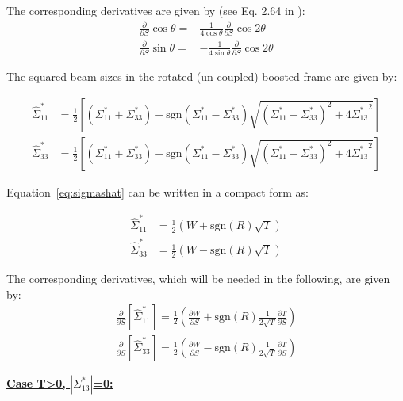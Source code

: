 The corresponding derivatives are given by (see Eq. 2.64 in \cite{refpaper}):
\begin{align}
\frac{\partial }{\partial S} \cos \theta =& \frac{1}{4 \cos \theta} \frac{\partial }{\partial S} \cos 2\theta \\
\frac{\partial }{\partial S} \sin \theta =& -\frac{1}{4 \sin \theta} \frac{\partial }{\partial S} \cos 2\theta \label{eq:dS_sintheta}
\end{align}

The squared beam sizes in the rotated (un-coupled) boosted frame are given by:

\begin{align}
\hat{\Sigma}^*_{11} &= \frac{1}{2}\left[ \left(\Sigma^*_{11} + \Sigma^*_{33}\right) +\textrm{sgn}\left(\Sigma^*_{11} - \Sigma^*_{33}\right)\sqrt{\left(\Sigma^*_{11} - \Sigma^*_{33}\right)^2 + 4 {\Sigma^*_{13}}^2 }\right] \\
\hat{\Sigma}^*_{33} &= \frac{1}{2}\left[ \left(\Sigma^*_{11} + \Sigma^*_{33}\right) -\textrm{sgn}\left(\Sigma^*_{11} - \Sigma^*_{33}\right)\sqrt{\left(\Sigma^*_{11} - \Sigma^*_{33}\right)^2 + 4 {\Sigma^*_{13}}^2 }\right] 
\label{eq:sigmashat}
\end{align}


Equation~\ref{eq:sigmashat} can be written in a compact form as:

\begin{align}
\hat{\Sigma}^*_{11} &= \frac{1}{2}\left(W + \textrm{sgn}(R)\sqrt{T} \right)\\
\hat{\Sigma}^*_{33} &= \frac{1}{2}\left(W - \textrm{sgn}(R)\sqrt{T} \right) \label{eq:Sigmashat}
\end{align}




The corresponding derivatives, which will be needed in the following, are given by:
\begin{align}
\frac{\partial }{\partial S} \left[\hat{\Sigma}^*_{11} \right] = \frac{1}{2}\left(\frac{\partial W}{\partial S} + \textrm{sgn}(R)\frac{1}{2\sqrt{T}}\frac{\partial T}{\partial S}  \right)\\
\frac{\partial }{\partial S} \left[\hat{\Sigma}^*_{33} \right] = \frac{1}{2}\left(\frac{\partial W}{\partial S} - \textrm{sgn}(R)\frac{1}{2\sqrt{T}}\frac{\partial T}{\partial S}  \right)\label{eq:dS_Sigmas}
\end{align}

\textbf{\underline{Case T>0, $\left|\Sigma^*_{13}\right|$=0:}}
~\\

